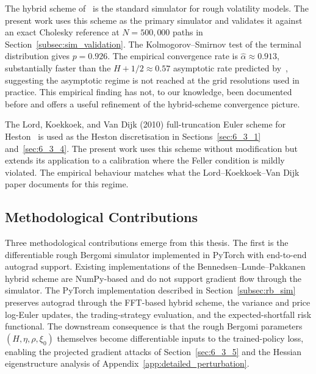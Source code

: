 \documentclass[12pt,a4paper]{article}
\theoremstyle{definition}
\theoremstyle{plain}
\theoremstyle{remark}
\theoremstyle{plain}
\begin{document}
The hybrid scheme of~\cite{BennedsenLundePakkanen2017} is the
standard simulator for rough volatility models. The present work
uses this scheme as the primary simulator and validates it against
an exact Cholesky reference at $N = 500{,}000$ paths in
Section~\ref{subsec:sim_validation}. The Kolmogorov--Smirnov test of
the terminal distribution gives $p = 0.926$. The empirical
convergence rate is $\hat\alpha \approx 0.913$, substantially faster
than the $H + 1/2 \approx 0.57$ asymptotic rate predicted
by~\cite{BennedsenLundePakkanen2017}, suggesting the asymptotic
regime is not reached at the grid resolutions used in practice. This
empirical finding has not, to our knowledge, been documented before
and offers a useful refinement of the hybrid-scheme convergence
picture.

The Lord, Koekkoek, and Van Dijk (2010) full-truncation Euler scheme
for Heston~\cite{LordKoekkoekVanDijk2010} is used as the Heston
discretisation in Sections~\ref{sec:6_3_1} and~\ref{sec:6_3_4}. The
present work uses this scheme without modification but extends its
application to a calibration where the Feller condition is mildly
violated. The empirical behaviour matches what the
Lord--Koekkoek--Van Dijk paper documents for this regime.

\subsection{Methodological Contributions}
\label{sec:7_3_methodological}

Three methodological contributions emerge from this thesis. The
first is the differentiable rough Bergomi simulator implemented in
PyTorch with end-to-end autograd support. Existing implementations
of the Bennedsen--Lunde--Pakkanen hybrid scheme are NumPy-based and
do not support gradient flow through the simulator. The PyTorch
implementation described in Section~\ref{subsec:rb_sim} preserves
autograd through the FFT-based hybrid scheme, the variance and
price log-Euler updates, the trading-strategy evaluation, and the
expected-shortfall risk functional. The downstream consequence is
that the rough Bergomi parameters $(H, \eta, \rho, \xi_0)$ themselves
become differentiable inputs to the trained-policy loss, enabling
the projected gradient attacks of Section~\ref{sec:6_3_5} and the
Hessian eigenstructure analysis of
Appendix~\ref{app:detailed_perturbation}.
\end{document}
